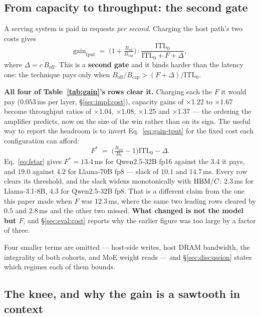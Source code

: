 \subsection{From capacity to throughput: the second gate}
\label{sec:model:omits}

A serving system is paid in requests \emph{per second}. Charging the host path's
two costs gives
%
\begin{equation}
\label{eq:gain-tput}
\text{gain}_{\text{tput}} \;=\;
  \Big(1 + \tfrac{B_{\mathrm{off}}}{B_{\mathrm{cap}}}\Big)
  \cdot \frac{\mathrm{ITL}_0}{\mathrm{ITL}_0 + F + \Delta},
\end{equation}
%
where $\Delta = c\,B_{\mathrm{off}}$. This is a \textbf{second gate} and it binds
harder than the latency one: the technique pays only when
$B_{\mathrm{off}}/B_{\mathrm{cap}} > (F + \Delta)/\mathrm{ITL}_0$.

\textbf{All four of Table~\ref{tab:gain}'s rows clear it.} Charging each the $F$ it
would pay ($0.053$\,ms per layer, \S\ref{sec:impl:cost}), capacity gains of
$\times$1.22 to $\times$1.67 become throughput ratios of $\times$1.04,
$\times$1.08, $\times$1.25 and $\times$1.37 --- the ordering the amplifier
predicts, now on the size of the win rather than on its sign. The useful way to
report the headroom is to invert Eq.~\ref{eq:gain-tput} for the fixed cost each
configuration can afford:
%
\begin{equation}
\label{eq:fstar}
F^{*} \;=\; \Big(\tfrac{B_{\mathrm{tot}}}{B_0} - 1\Big)\mathrm{ITL}_0 - \Delta.
\end{equation}
%
Eq.~\ref{eq:fstar} gives $F^{*} = 13.4$\,ms for Qwen2.5-32B fp16 against the
$3.4$ it pays, and $19.0$ against $4.2$ for Llama-70B fp8 --- slack of $10.1$ and
$14.7$\,ms. Every row clears its threshold, and the slack widens monotonically
with $\mathrm{HBM}/C$: $2.3$\,ms for Llama-3.1-8B, $4.3$ for Qwen2.5-32B fp8. That is a
different claim from the one this paper made when $F$ was $12.3$\,ms, where the
same two leading rows cleared by $0.5$ and $2.8$\,ms and the other two missed.
\textbf{What changed is not the model but $F$}, and \S\ref{sec:eval:cost} reports
why the earlier figure was too large by a factor of three.

Four smaller terms are omitted --- host-side writes, host DRAM bandwidth, the
integrality of both cohorts, and MoE weight reads --- and \S\ref{sec:discussion}
states which regimes each of them bounds.

\subsection{The knee, and why the gain is a sawtooth in context}
\label{sec:model:knee}

